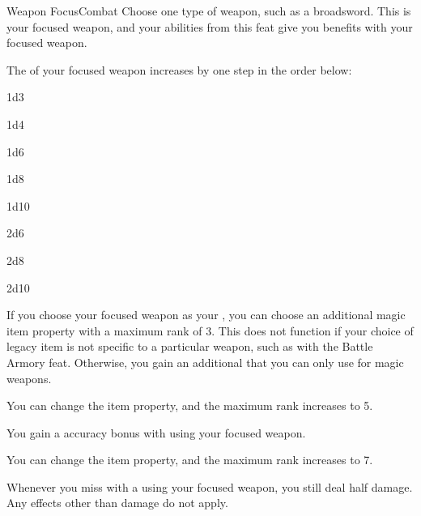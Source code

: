   \begin{feat}{Weapon Focus}{Combat}
     Choose one type of weapon, such as a broadsword.
    This is your focused weapon, and your abilities from this feat give you benefits with your focused weapon.

     The  of your focused weapon increases by one step in the order below:
    \begin{raggeditemize}
      \item 1d3
      \item 1d4
      \item 1d6
      \item 1d8
      \item 1d10
      \item 2d6
      \item 2d8
      \item 2d10
    \end{raggeditemize}

     If you choose your focused weapon as your , you can choose an additional magic item property with a maximum rank of 3.
    This does not function if your choice of legacy item is not specific to a particular weapon, such as with the Battle Armory feat.
    Otherwise, you gain an additional  that you can only use for magic weapons.

     You can change the item property, and the maximum rank increases to 5.

     You gain a  accuracy bonus with  using your focused weapon.

     You can change the item property, and the maximum rank increases to 7.

     Whenever you miss with a  using your focused weapon, you still deal half damage.
    Any effects other than damage do not apply.
  \end{feat}


